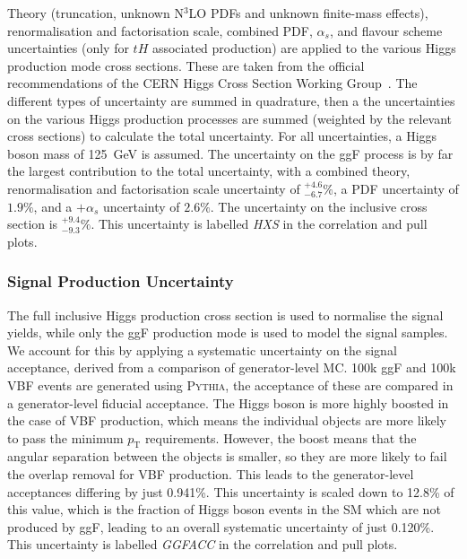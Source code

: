 \documentclass[NOTE, atlasdraft=true, texlive=2017, UKenglish]{\ATLASLATEXPATH atlasdoc}
\begin{document}
Theory (truncation, unknown N$^3$LO PDFs and unknown finite-mass effects), renormalisation and factorisation scale, combined PDF, $\alpha_s$, and flavour scheme uncertainties (only for $tH$ associated production) are applied to the various Higgs production mode cross sections. These are taken from the official recommendations of the CERN Higgs Cross Section Working Group~\cite{Dittmaier:2011ti,Dittmaier:2012vm}. The different types of uncertainty are summed in quadrature, then a the uncertainties on the various Higgs production processes are summed (weighted by the relevant cross sections) to calculate the total uncertainty. For all uncertainties, a Higgs boson mass of 125~GeV is assumed. The uncertainty on the ggF process is by far the largest contribution to the total uncertainty, with a combined theory, renormalisation and factorisation scale uncertainty of $^{+4.6}_{-6.7}\%$, a PDF uncertainty of $1.9\%$, and a $+\alpha_s$ uncertainty of $2.6\%$. The uncertainty on the inclusive cross section is $^{+9.4}_{-9.3}\%$. This uncertainty is labelled \emph{HXS} in the correlation and pull plots. %


\subsubsection{Signal Production Uncertainty}
\label{sec:syssigprodmodel}

The full inclusive Higgs production cross section is used to normalise the signal yields, while only the ggF production mode is used to model the signal samples. We account for this by applying a systematic uncertainty on the signal acceptance, derived from a comparison of generator-level MC. 100k ggF and 100k VBF events are generated using \textsc{Pythia}, the acceptance of these are compared in a generator-level fiducial acceptance. The Higgs boson is more highly boosted in the case of VBF production, which means the individual objects are more likely to pass the minimum $p_\text{T}$ requirements. However, the boost means that the angular separation between the objects is smaller, so they are more likely to fail the overlap removal for VBF production. This leads to the generator-level acceptances differing by just 0.941\%. This uncertainty is scaled down to 12.8\% of this value, which is the fraction of Higgs boson events in the SM which are not produced by ggF, leading to an overall systematic uncertainty of just 0.120\%. This uncertainty is labelled \emph{GGFACC} in the correlation and pull plots.
\end{document}
